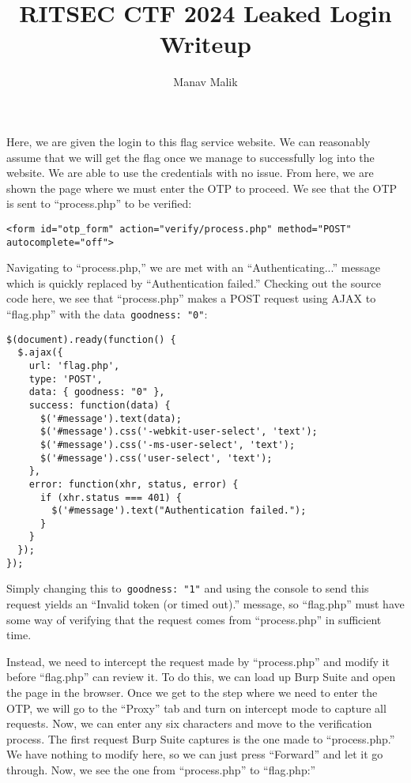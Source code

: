 \documentclass{article}
\title{RITSEC CTF 2024 Leaked Login Writeup}
\author{Manav Malik}
\date{}
\begin{document}
\maketitle

Here, we are given the login to this flag service website. We can reasonably assume that we will get the flag once we manage to successfully log into the website. We are able to use the credentials with no issue. From here, we are shown the page where we must enter the OTP to proceed. We see that the OTP is sent to ``process.php'' to be verified:

\begin{center}\texttt{<form id="otp\_form" action="verify/process.php" method="POST" autocomplete="off"> }\end{center}

Navigating to ``process.php,'' we are met with an ``Authenticating...'' message which is quickly replaced by ``Authentication failed.'' Checking out the source code here, we see that ``process.php'' makes a POST request using AJAX to ``flag.php'' with the data\texttt{ goodness: "0"}:

\begin{center}
    \begin{verbatim}  
$(document).ready(function() {
  $.ajax({
    url: 'flag.php',
    type: 'POST',
    data: { goodness: "0" },
    success: function(data) {
      $('#message').text(data);
      $('#message').css('-webkit-user-select', 'text');
      $('#message').css('-ms-user-select', 'text');
      $('#message').css('user-select', 'text');
    },
    error: function(xhr, status, error) {
      if (xhr.status === 401) {
        $('#message').text("Authentication failed.");
      }
    }
  });
});
    \end{verbatim}
\end{center}

Simply changing this to\texttt{ goodness: "1"} and using the console to send this request yields an ``Invalid token (or timed out).'' message, so ``flag.php'' must have some way of verifying that the request comes from ``process.php'' in sufficient time.

Instead, we need to intercept the request made by ``process.php'' and modify it before ``flag.php'' can review it. To do this, we can load up Burp Suite and open the page in the browser. Once we get to the step where we need to enter the OTP, we will go to the ``Proxy'' tab and turn on intercept mode to capture all requests. Now, we can enter any six characters and move to the verification process. The first request Burp Suite captures is the one made to ``process.php.'' We have nothing to modify here, so we can just press ``Forward'' and let it go through. Now, we see the one from ``process.php'' to ``flag.php:''
\end{document}

